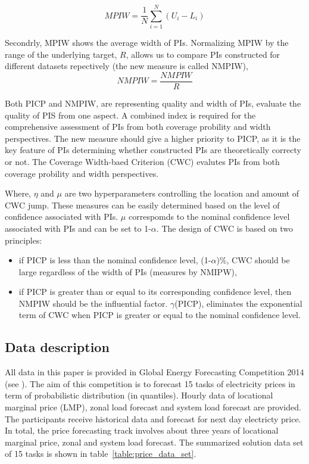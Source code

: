 \documentclass[review]{elsarticle}
\begin{document}
        \begin{equation}
          MPIW = \frac{1}{N} \sum_{i=1}^{N} (U_{i}-L_{i})
          \label{eq.MPIW}
        \end{equation}

        Secondrly, MPIW shows the average width of PIs.
        Normalizing MPIW by the range of the underlying target, $R$, allows us to compare PIs constructed for different datasets repectively (the new measure is called NMPIW),
        \begin{equation}
          NMPIW = \frac{NMPIW}{R}
          \label{eq.NMPIW}
        \end{equation}

        Both PICP and NMPIW, are representing quality and width of PIs, evaluate the quality of PIS from one aspect.
        A combined index is required for the comprehensive assessment of PIs from both coverage probility and width perspectives.
        The new measure should give a higher priority to PICP, as it is the key feature of PIs determining whether constructed PIs are theoretically correcty or not.
        The Coverage Width-baed Criterion (CWC) evalutes PIs from both coverage probility and width perspectives.

        Where, $\eta$ and $\mu$ are two hyperparameters controlling the location and amount of CWC jump.
        These measures can be easily determined based on the level of confidence associated with PIs.
        $\mu$ correspomds to the nominal confidence level associated with PIs and can be set to 1-$\alpha$.
        The design of CWC is based on two principles:

        \begin{itemize}
          \item if PICP is less than the nominal confidence level, (1-$\alpha$)$\%$, CWC should be large regardless of the width of PIs (measures by NMIPW),
          \item if PICP is greater than or equal to its corresponding confidence level, then NMPIW should be the influential factor.
          $\gamma$(PICP), eliminates the exponential term of CWC when PICP is greater or equal to the nominal confidence level.
        \end{itemize}

    \subsection{Data description}
      All data in this paper is provided in Global Energy Forecasting Competition 2014 (see \cite{Hong2016}).
      The aim of this competition is to forecast 15 tasks of electricity prices in term of probabilistic distribution (in quantiles).
      Hourly data of locational marginal price (LMP), zonal load forecast and system load forecast are provided.
      The participants receive historical data and forecast for next day electricty price.
      In total, the price forecasting track involves about three years of locational marginal price, zonal and system load forecast.
      The summarized solution data set of 15 tasks is shown in table~\ref{table:price_data_set}.
\end{document}
